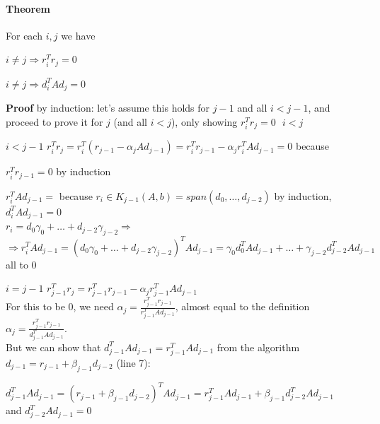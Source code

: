 \documentclass[10pt]{report}
\begin{document}
\paragraph{Theorem} For each $i,j$ we have
\begin{list}{}{}
	\item $i\neq j \Rightarrow r_i^Tr_j=0$
	\item $i\neq j \Rightarrow d_i^TAd_j=0$
\end{list}
\textbf{Proof} by induction: let's assume this holds for $j-1$ and all $i<j-1$, and proceed to prove it for $j$ (and all $i<j$), only showing $r_i^Tr_j = 0\:\:\:i<j$
\begin{list}{}{}
	\item[$i<j-1$] $r_i^Tr_j = r_i^T(r_{j-1}-\alpha_jAd_{j-1})=r_i^Tr_{j-1}-\alpha_jr_i^TAd_{j-1} = 0$ because
	\begin{list}{}{}
		\item $r_i^Tr_{j-1} = 0$ by induction
		\item $r_i^TAd_{j-1} = $ because $r_i\in K_{j-1}(A,b) = span(d_0,\ldots,d_{j-2})$ by induction, $d_i^TAd_{j-1}=0$\\
		$r_i = d_0\gamma_0 + \ldots + d_{j-2}\gamma_{j-2} \Rightarrow$\\
		$\Rightarrow r_i^TAd_{j-1} = ( d_0\gamma_0 + \ldots + d_{j-2}\gamma_{j-2})^TAd_{j-1} = \gamma_0d_0^TAd_{j-1}+\ldots + \gamma_{j-2}d_{j-2}^TAd_{j-1}$ all to 0
	\end{list}
	\item[$i=j-1$] $r_{j-1}^Tr_j = r_{j-1}^Tr_{j-1} -\alpha_jr_{j-1}^TAd_{j-1}$\\
	For this to be 0, we need $\alpha_j = \frac{r_{j-1}^Tr_{j-1}}{r_{j-1}^TAd_{j-1}}$, almost equal to the definition $\alpha_j = \frac{r_{j-1}^Tr_{j-1}}{d_{j-1}^TAd_{j-1}}$.\\
	But we can show that $d_{j-1}^TAd_{j-1} = r_{j-1}^TAd_{j-1}$ from the algorithm $d_{j-1} = r_{j-1}+\beta_{j-1}d_{j-2}$ (line 7):
	\begin{list}{}{}
		\item $d_{j-1}^TAd_{j-1} =(r_{j-1}+\beta_{j-1}d_{j-2})^TAd_{j-1} = r_{j-1}^TAd_{j-1} + \beta_{j-1}d_{j-2}^TAd_{j-1}$\\
		and $d_{j-2}^TAd_{j-1} = 0$
	\end{list}
\end{list}
\end{document}
